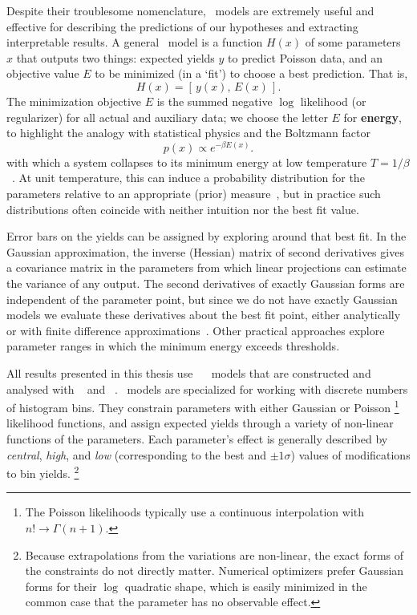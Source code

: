 Despite their troublesome nomenclature, \heplikelihood\ models are extremely
useful and effective for describing the predictions of our hypotheses and
extracting interpretable results.
A general \heplikelihood\ model is a function $H(x)$ of some parameters $x$
that outputs two things:
expected yields $y$ to predict Poisson data,
and an objective value $E$ to be minimized (in a `fit') to choose a best
prediction.
That is,
\begin{equation}
H(x) = [\,y(x), \,E(x)\,]
.
\end{equation}
The minimization objective $E$ is the summed negative $\log$ likelihood
(or regularizer) for all actual and auxiliary data;
we choose the letter $E$ for \textbf{energy}, to highlight the analogy with
statistical physics and the Boltzmann factor
\begin{equation}
p(x) \propto e^{-\beta E(x)}
.
\end{equation}
with which a system collapses to its minimum energy at low temperature
$T = 1/\beta$~\cite{
skilling2017david,
lecun-06,
pmlr-v2-ranzato07a
}.
At unit temperature, this can induce a probability distribution
for the parameters relative to an appropriate (prior)
measure~\cite{cranmer2012histfactory, skilling2017david},
but in practice such distributions often coincide with neither intuition nor
the best fit value.

Error bars on the yields can be assigned by exploring around that best fit.
In the Gaussian approximation, the inverse (Hessian) matrix of second
derivatives gives a covariance matrix in the parameters from which linear
projections can estimate the variance of any output.
The second derivatives of exactly Gaussian forms are independent of the
parameter point, but since we do not have exactly Gaussian models we evaluate
these derivatives about the best fit point, either analytically or with finite
difference approximations~\cite{cranmer2021building}.
Other practical approaches explore parameter ranges in which the minimum energy
exceeds thresholds.

All results presented in this thesis use
\histfactory~\cite{cranmer2012histfactory} \heplikelihood\ models that are
constructed and analysed with
\histfitter~\cite{Besjes_2015,baak2015histfitter}
and \pyhf~\cite{heinrich2021pyhf}.
\histfactory\ models are specialized for working with discrete numbers of
histogram bins.
They constrain parameters with either Gaussian or Poisson%
\footnote{%
The Poisson likelihoods typically use a continuous interpolation with
$n!\rightarrow \Gamma(n + 1)$.%
}
likelihood
functions, and assign expected yields through a variety of
non-linear functions of the parameters.
Each parameter's effect is generally described by
\emph{central}, \emph{high}, and \emph{low}
(corresponding to the best and $\pm1\sigma$)
values of modifications to bin yields.%
\footnote{%
Because extrapolations from the variations are non-linear, the exact forms of
the constraints do not directly matter.
Numerical optimizers prefer Gaussian forms for their $\log$ quadratic shape, which is
easily minimized in the common case that the parameter has no observable
effect.%
}

